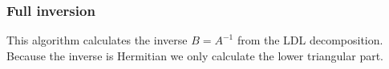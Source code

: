 \documentclass[12pt]{article}
\begin{document}
\subsubsection*{Full inversion}
This algorithm calculates the inverse $B=A^{-1}$ from the LDL decomposition. Because the inverse is Hermitian we only calculate the lower triangular part.
\begin{center}
\end{center}
\end{document}
